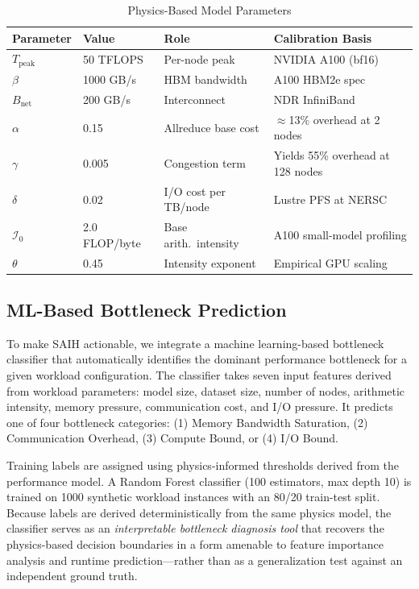 \documentclass{llncs}
\begin{document}
\begin{table}[t]
\centering
\caption{Physics-Based Model Parameters}
\label{tab:model-params}
\begin{tabular*}{\columnwidth}{@{\extracolsep{\fill}} llll @{}}
\toprule
\textbf{Parameter} & \textbf{Value} & \textbf{Role} & \textbf{Calibration Basis} \\
\midrule
$T_\text{peak}$ & 50 TFLOPS & Per-node peak & NVIDIA A100 (bf16) \\
$\beta$ & 1000 GB/s & HBM bandwidth & A100 HBM2e spec \\
$B_\text{net}$ & 200 GB/s & Interconnect & NDR InfiniBand \\
$\alpha$ & 0.15 & Allreduce base cost & $\approx$13\% overhead at 2 nodes \\
$\gamma$ & 0.005 & Congestion term & Yields 55\% overhead at 128 nodes \\
$\delta$ & 0.02 & I/O cost per TB/node & Lustre PFS at NERSC \cite{Byna2020} \\
$\mathcal{I}_0$ & 2.0 FLOP/byte & Base arith.\ intensity & A100 small-model profiling \cite{Jia2018} \\
$\theta$ & 0.45 & Intensity exponent & Empirical GPU scaling \cite{Jia2018} \\
\bottomrule
\end{tabular*}
\end{table}

\subsection{ML-Based Bottleneck Prediction}

To make SAIH actionable, we integrate a machine learning-based bottleneck classifier that automatically identifies the dominant performance bottleneck for a given workload configuration. The classifier takes seven input features derived from workload parameters: model size, dataset size, number of nodes, arithmetic intensity, memory pressure, communication cost, and I/O pressure. It predicts one of four bottleneck categories: (1) Memory Bandwidth Saturation, (2) Communication Overhead, (3) Compute Bound, or (4) I/O Bound.

Training labels are assigned using physics-informed thresholds derived from the performance model. A Random Forest classifier (100 estimators, max depth 10) is trained on 1000 synthetic workload instances with an 80/20 train-test split. Because labels are derived deterministically from the same physics model, the classifier serves as an \textit{interpretable bottleneck diagnosis tool} that recovers the physics-based decision boundaries in a form amenable to feature importance analysis and runtime prediction---rather than as a generalization test against an independent ground truth.
\end{document}
